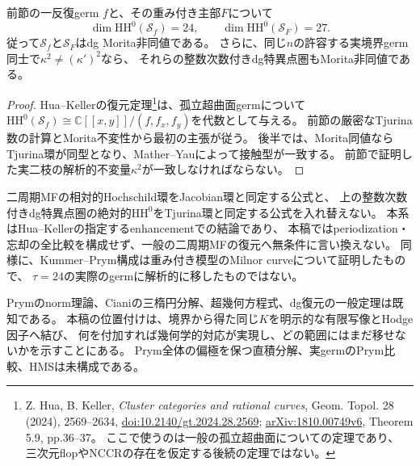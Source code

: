\begin{corollary}[実境界と主部のdg特異点圏は非同値]
\label{cor:actual-germ-Zdg-distinction}
前節の一反復germ $f$と、その重み付き主部$F$について
\[
 \dim\mathrm{HH}^0(\mathcal S_f)=24,\qquad
 \dim\mathrm{HH}^0(\mathcal S_F)=27.
\]
従って$\mathcal S_f$と$\mathcal S_F$はdg Morita非同値である。
さらに、同じ$n$の許容する実境界germ同士で$\kappa^2\ne(\kappa')^2$なら、
それらの整数次数付きdg特異点圏もMorita非同値である。
\end{corollary}
\begin{proof}
Hua--Kellerの復元定理\footnote{
Z. Hua, B. Keller, \emph{Cluster categories and rational curves},
Geom. Topol. 28 (2024), 2569--2634,
\href{https://doi.org/10.2140/gt.2024.28.2569}{doi:10.2140/gt.2024.28.2569};
\href{https://arxiv.org/abs/1810.00749v6}{arXiv:1810.00749v6}, Theorem 5.9, pp.36--37。
ここで使うのは一般の孤立超曲面についての定理であり、
三次元flopやNCCRの存在を仮定する後続の定理ではない。
}は、孤立超曲面germについて
$\mathrm{HH}^0(\mathcal S_f)\cong\mathbb C[[x,y]]/(f,f_x,f_y)$を代数として与える。
前節の厳密なTjurina数の計算とMorita不変性から最初の主張が従う。
後半では、Morita同値ならTjurina環が同型となり、Mather--Yauによって接触型が一致する。
前節で証明した実二枝の解析的不変量$\kappa^2$が一致しなければならない。
\end{proof}

\begin{remark}
二周期MFの相対的Hochschild環をJacobian環と同定する公式と、
上の整数次数付きdg特異点圏の絶対的$\mathrm{HH}^0$をTjurina環と同定する公式を入れ替えない。
本系はHua--Kellerの指定するenhancementでの結論であり、
本稿ではperiodization・忘却の全比較を構成せず、一般の二周期MFの復元へ無条件に言い換えない。
同様に、Kummer--Prym構成は重み付き模型のMilnor curveについて証明したもので、
$\tau=24$の実際のgermに解析的に移したものではない。

Prymのnorm理論、Cianiの三楕円分解、超幾何方程式、dg復元の一般定理は既知である。
本稿の位置付けは、境界から得た同じ$K$を明示的な有限写像とHodge因子へ結び、
何を付加すれば幾何学的対応が実現し、どの範囲にはまだ移せないかを示すことにある。
Prym全体の偏極を保つ直積分解、実germのPrym比較、HMSは未構成である。
\end{remark}

